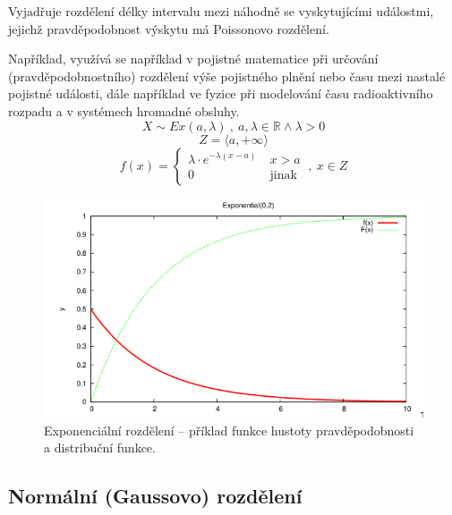 \begin{compactitem}
    \item Vyjadřuje rozdělení délky intervalu mezi náhodně se vyskytujícími událostmi, jejichž pravděpodobnost výskytu má Poissonovo rozdělení.
    \item Například, využívá se například v pojistné matematice při určování (pravděpodobnostního) rozdělení výše pojistného plnění nebo času mezi nastalé pojistné události, dále například ve fyzice při modelování času radioaktivního rozpadu a v systémech hromadné obsluhy.
    $$ X \sim Ex(a, \lambda) ~,~ a, \lambda \in \mathbb{R} \land \lambda > 0 $$
    $$ Z = \langle a, +\infty \rangle $$
    $$ f(x) = \left\{
        \begin{array}{ll}
            \lambda \cdot e^{-\lambda (x - a)} ~ & x > a        \\
            0             ~                      & \text{jinak}
        \end{array}
        \right. ~,~ x \in Z
    $$
\end{compactitem}

\begin{figure}[H]
    \centering
    \includegraphics[width=1\linewidth]{snp_exponencialni.png}
    \caption{Exponenciální rozdělení -- příklad funkce hustoty pravděpodobnosti a distribuční funkce.}
\end{figure}

\subsection{Normální (Gaussovo) rozdělení}

